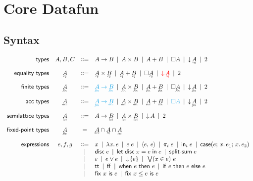 \documentclass{article}
\begin{document}
\section{Core Datafun}


\subsection{Syntax}

\[
\begin{array}{rccl}
  \textsf{types} & A,B,C
  &\bnfeq& A \to B \pipe A \x B \pipe A + B
  \pipe \Disc{A} \pipe \Down{\eq{A}} \pipe \tbool
  \vspace{1em}\\

  \textsf{equality types} & \eq{A}
  &\bnfeq& \eq{A} \x \eq{B} \pipe \eq{A} + \eq{B}
  \pipe \Disc{\eq{A}} \pipe {\color{red} \Down{\eq{A}}} \pipe \tbool
  \vspace{1em}\\

  \textsf{finite types} & \fin{A}
  &\bnfeq& {\color{Cerulean} \fin{A} \to \fin{B}}
  \pipe \fin{A} \x \fin{B} \pipe \fin{A} + \fin{B}
  \pipe \Disc{\fin{A}} \pipe \Down{\fin{A}} \pipe \tbool
  \vspace{1em}\\

  \textsf{acc types} & \acc{A}
  &\bnfeq& {\color{Cerulean} \fin{A} \to \acc{B}}
  \pipe \acc{A} \x \acc{B} \pipe \acc{A} + \acc{B}
  \pipe {\color{Cerulean} \Disc{A}} \pipe \Down{\fin{A}} \pipe \tbool
  \vspace{1em}\\

  \textsf{semilattice types} & \lat{A}
  &\bnfeq& A \to \lat{B} \pipe \lat{A} \x \lat{B} \pipe \Down{A} \pipe \tbool
  \vspace{1em}\\

  \textsf{fixed-point types} & \under{fix}{A}
  &=& \acc{A} \cap \eq{A} \cap \lat{A}
  \vspace{1em}\\

  \textsf{expressions} & e,f,g
  &\bnfeq& x \pipe \fn\bind{x} e \pipe e\; e
  \pipe \pair{e}{e} \pipe \pi_i\; e
  \pipe \inj{i}{e} \pipe \case{e}{x}{e_1}{x}{e_2} \\
  &&\pipe& \disc{e} \pipe \letdisc{x}{e}{e} \pipe \splitsum{e}\\
  &&\pipe& \unit \pipe e \vee e \pipe \downintro{e} \pipe \downelim{x}{e}{e}\\
  &&\pipe& \ett \pipe \eff \pipe \when{e}{e} \pipe \ifthen{e}{e}{e}\\
  &&\pipe& \fix{x}{e} \pipe \fixle{x}{e}{e}
\end{array}
\]
\end{document}

